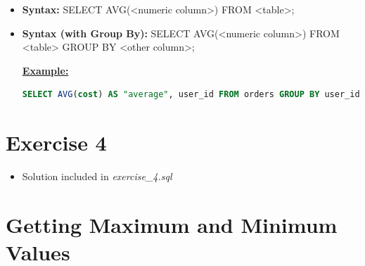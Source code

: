 \documentclass[12pt]{article}
\begin{document}
\begin{itemize}
    \item \textbf{Syntax:} SELECT AVG(<numeric column>) FROM <table>;
    \item \textbf{Syntax (with Group By):} SELECT AVG(<numeric column>) FROM <table> GROUP BY <other column>;

    \bigskip

    \underline{\textbf{Example:}}

    \bigskip

    \begin{lstlisting}[language=SQL]
    SELECT AVG(cost) AS "average", user_id FROM orders GROUP BY user_id;
    \end{lstlisting}
\end{itemize}

\bigskip

\section{Exercise 4}

\bigskip

\begin{itemize}
    \item Solution included in \textit{exercise\_4.sql}
\end{itemize}

\bigskip

\section{Getting Maximum and Minimum Values}

\bigskip
\end{document}
